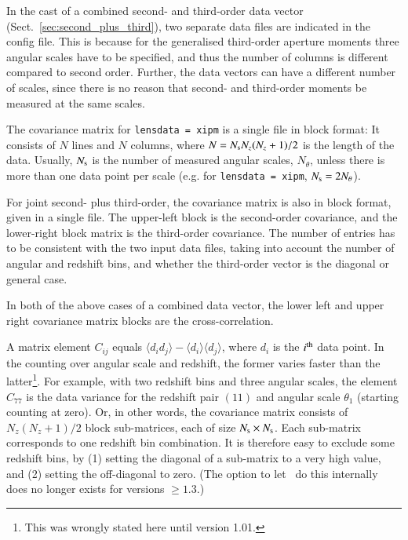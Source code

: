 \documentclass[11pt, chapterprefix, headsepline]{scrartcl}
\begin{document}
\begin{appendix}
In the cast of a combined second- and third-order data vector
(Sect.~\ref{sec:second_plus_third}), two separate data files are indicated in
the config file. This is because for the generalised third-order aperture
moments three angular scales have to be specified, and thus the number of
columns is different compared to second order. Further, the data vectors can
have a different number of scales, since there is no reason that second- and
third-order moments be measured at the same scales.

The covariance matrix for \texttt{lensdata = xipm} is a single file in block format: It
consists of $N$ lines and $N$ columns, where $N = N_{\rm s} N_z (N_z + 1)/2$ is
the length of the data. Usually, $N_{\rm s}$ is the number of measured angular
scales, $N_\theta$, unless there is more than one data point per scale (e.g.
for \texttt{lensdata = xipm}, $N_{\rm s} = 2 N_\theta$).

For joint second- plus third-order, the covariance matrix is also in block
format, given in a single file. The upper-left block is the second-order
covariance, and the lower-right block matrix is the third-order covariance. The
number of entries has to be consistent with the two input data files, taking
into account the number of angular and redshift bins, and whether the
third-order vector is the diagonal or general case.

In both of the above cases of a combined data vector, the lower left and upper
right covariance matrix blocks are the cross-correlation. 

A matrix element $C_{ij}$ equals $\langle d_i d_j \rangle - \langle d_i \rangle
\langle d_j \rangle$, where $d_i$ is the $i^{\rm th}$ data point. In the
counting over angular scale and redshift, the former varies faster than the
latter\footnote{This was wrongly stated here until version 1.01.}. For example,
with two redshift bins and three angular scales, the element $C_{77}$ is the
data variance for the redshift pair $(11)$ and angular scale $\theta_1$
(starting counting at zero). Or, in other words, the covariance matrix consists
of $N_z (N_z + 1) / 2$ block sub-matrices, each of size $N_{\rm s} \times
N_{\rm s}$. Each sub-matrix corresponds to one redshift bin combination. It is
therefore easy to exclude some redshift bins, by (1) setting the diagonal of a
sub-matrix to a very high value, and (2) setting the off-diagonal to zero. (The
option to let \CosmoPMC\ do this internally does no longer exists for versions
$\ge 1.3$.) 


\end{appendix}
\end{document}
